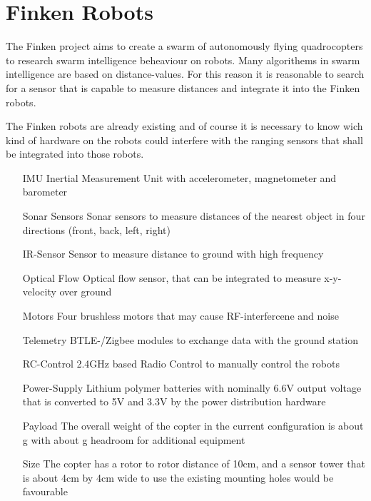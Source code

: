\section{Finken Robots}

The Finken project aims to create a swarm of autonomously flying quadrocopters to research swarm intelligence beheaviour on robots.
Many algorithems in swarm intelligence are based on distance-values. 
For this reason it is reasonable to search for a sensor that is capable to measure distances and integrate it into the Finken robots. 

The Finken robots are already existing and of course it is necessary to know wich kind of hardware on the robots could interfere with the ranging sensors that shall be integrated into those robots.

\begin{itemize}
	\item[IMU] Inertial Measurement Unit with accelerometer, magnetometer and barometer
	\item[Sonar Sensors] Sonar sensors to measure distances of the nearest object in four directions (front, back, left, right)
	\item[IR-Sensor] Sensor to measure distance to ground with high frequency
	\item[Optical Flow] Optical flow sensor, that can be integrated to measure x-y-velocity over ground
	\item[Motors] Four brushless motors that may cause RF-interfercene and noise
	\item[Telemetry] BTLE-/Zigbee modules to exchange data with the ground station
	\item[RC-Control] 2.4GHz based Radio Control to manually control the robots
	\item[Power-Supply] Lithium polymer batteries with nominally 6.6V  output voltage that is converted to 5V and 3.3V by the power distribution hardware
	\item[Payload] The overall weight of the copter in the current configuration is about g with about g headroom for additional equipment
	\item[Size] The copter has a rotor to rotor distance of 10cm, and a sensor tower that is about 4cm by 4cm wide to use the existing mounting holes would be favourable
\end{itemize}

